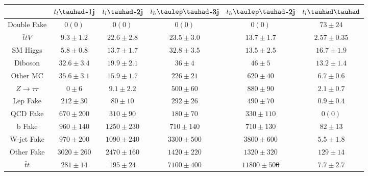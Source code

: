 \documentclass[PAPER, coverpage, atlasdraft=true, texlive=2016, UKenglish]{\ATLASLATEXPATH atlasdoc}
\providecommand{\DIFadd}[1]{{\protect\color{blue}\uwave{#1}}} %
\providecommand{\DIFdel}[1]{{\protect\color{red}\sout{#1}}}                      %
\providecommand{\DIFaddFL}[1]{\DIFadd{#1}} %
\providecommand{\DIFdelFL}[1]{\DIFdel{#1}} %
\providecommand{\DIFaddbeginFL}{} %
\providecommand{\DIFaddendFL}{} %
\providecommand{\DIFdelbeginFL}{} %
\providecommand{\DIFdelendFL}{} %
\begin{document}
\begin{table}[htbp]
\begin{tabular}{cccccc} \toprule\toprule
 & $t_l\tauhad$-1j & $t_l\tauhad$-2j & $t_h\tlhad$-3j &$t_h\tlhad$-2j  & $t_l\thadhad$ \\\midrule
  Double Fake            & \DIFdelbeginFL \DIFdelFL{$0 (0)       $  }\DIFdelendFL \DIFaddbeginFL \DIFaddFL{$--       $  }\DIFaddendFL & \DIFdelbeginFL \DIFdelFL{$0 (0)       $  }\DIFdelendFL \DIFaddbeginFL \DIFaddFL{$--       $  }\DIFaddendFL & \DIFdelbeginFL \DIFdelFL{$0 (0)       $  }\DIFdelendFL \DIFaddbeginFL \DIFaddFL{$--       $  }\DIFaddendFL &  \DIFdelbeginFL \DIFdelFL{$0 (0)       $  }\DIFdelendFL \DIFaddbeginFL \DIFaddFL{$--       $  }\DIFaddendFL & $73 \pm 24    $ \\ 
  $\bar{t}tV$            & $9.3 \pm 1.2 $  & $22.6 \pm 2.8$  & $23.5 \pm 3.0$  &  $13.7 \pm 1.7$  & $2.57 \pm 0.35$ \\ 
  SM Higgs               & $5.8 \pm 0.8 $  & $13.7 \pm 1.7$  & $32.8 \pm 3.5$  &  $13.5 \pm 2.5$  & $16.7 \pm 1.9 $ \\ 
  Diboson                & $32.6 \pm 3.4$  & $19.9 \pm 2.1$  & $36 \pm 4    $  &  $46 \pm 5    $  & $13.2 \pm 1.4 $ \\ 
  Other MC               & $35.6 \pm 3.1$  & $15.9 \pm 1.7$  & $226 \pm 21  $  &  $620 \pm 40  $  & $6.7 \pm 0.6  $  \\ 
  $Z\rightarrow\tau\tau$ & $0 \pm 6     $  & $9.1 \pm 2.2 $  & $500 \pm 60  $  &  $880 \pm 90  $  & $2.1 \pm 0.7  $ \\ 
  Lep Fake               & $212 \pm 30  $  & $80 \pm 10   $  & $292 \pm 26  $  &  $490 \pm 70  $  & $0.9 \pm 0.4  $ \\ 
  QCD Fake               & $670 \pm 200 $  & $310 \pm 90  $  & $180 \pm 70  $  &  $330 \pm 110 $  & \DIFdelbeginFL \DIFdelFL{$0 (0)        $  }\DIFdelendFL \DIFaddbeginFL \DIFaddFL{$--        $  }\DIFaddendFL \\ 
  b Fake                 & $960 \pm 140 $  & $1250 \pm 230$  & $710 \pm 140 $  &  $710 \pm 130 $  & $82 \pm 13    $ \\ 
  W-jet Fake             & $970 \pm 200 $  & $1090 \pm 240$  & $3300 \pm 500$  &  $3800 \pm 600$  & $5.5 \pm 1.8  $ \\ 
  Other Fake             & $3020 \pm 260$  & $2470 \pm 160$  & $1420 \pm 220$  &  $1320 \pm 320$  & $129 \pm 14   $ \\ 
  $\bar{t}t$             & $281 \pm 14  $  & $195 \pm 24  $  & $7100 \pm 400$  &  \DIFdelbeginFL \DIFdelFL{$11800 \pm 50$0 }\DIFdelendFL \DIFaddbeginFL \DIFaddFL{$11800 \pm 500$ }\DIFaddendFL & $7.7 \pm 2.7  $ \\ 

\end{tabular}
\end{table}
\end{document}
